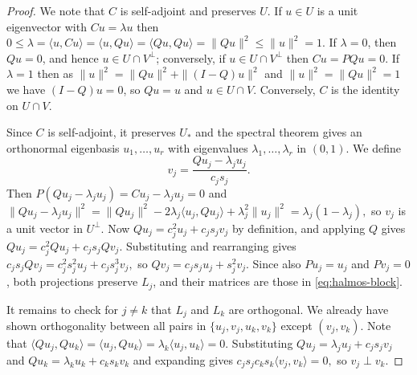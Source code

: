 \documentclass[10pt,a4paper]{amsart}
\newcommand{\lL}{\lambda}
\begin{document}
\begin{proof}
We note that $C$ is self-adjoint and preserves $U$.
If $u\in U$ is a unit eigenvector with $Cu=\lambda u$ then 
\(  0 \le \lambda
 =\langle u,Cu\rangle
 =\langle u,Qu\rangle
 =\langle Qu,Qu\rangle
 =\|Qu\|^2 \le \|u\|^2 = 1 \).
If $\lambda=0$, then $Qu=0$, and hence $u\in U\cap V^\perp$;
conversely, if $u\in U\cap V^\perp$ then $Cu = PQu=0$.
If $\lambda=1$ then as $\|u\|^2=\|Qu\|^2+\|(I-Q)u\|^2$
and $\|u\|^2=\|Qu\|^2=1$ we have $(I-Q)u=0$, so $Qu=u$ and $u\in U\cap V$. 
Conversely, $C$ is the identity on $U\cap V$.  

Since $C$ is self-adjoint, it preserves $U_*$ and the
spectral theorem  gives an orthonormal eigenbasis $u_1,\ldots,u_r$ 
with eigenvalues  $\lL_1,\ldots,\lL_r$ in $(0,1)$. We define
\[
 v_j=\frac{Qu_j-\lambda_j u_j}{c_js_j}.
\]
Then
\(
 P(Qu_j-\lambda_j u_j)
 =Cu_j-\lambda_j u_j
 =0
\)
and
\(
 \|Qu_j-\lambda_j u_j\|^2
 =
 \|Qu_j\|^2
 -2\lambda_j\langle u_j,Qu_j\rangle
 +\lambda_j^2\|u_j\|^2
 =\lambda_j(1-\lambda_j),
\)
so $v_j$ is a unit vector in $U^\perp$.
Now
\(
 Qu_j=c_j^2u_j+c_js_jv_j
\)
by definition, and applying $Q$ gives
\(
 Qu_j =c_j^2Qu_j+c_js_jQv_j.
\)
Substituting and rearranging gives
\(
 c_js_jQv_j
 =c_j^2s_j^2u_j+c_js_j^3v_j,
\)
so
\(
 Qv_j=c_js_ju_j+s_j^2v_j.
\)
Since also $Pu_j=u_j$ and $Pv_j=0$, both projections preserve
$L_j$, and their matrices are those in \eqref{eq:halmos-block}.

It remains to check for $j \ne k$ that $L_j$ and $L_k$ are orthogonal. 
We already have shown orthogonality between all pairs in $\{u_j,v_j,u_k,v_k\}$
except $(v_j,v_k)$. Note that
\(
 \langle Qu_j,Qu_k\rangle
 =\langle u_j,Qu_k\rangle
 =\lambda_k\langle u_j,u_k\rangle
 =0.
\)
Substituting $Qu_j=\lambda_j u_j+c_js_jv_j$
and $Qu_k=\lambda_k u_k+c_ks_kv_k$
and expanding gives 
\(
 c_js_jc_ks_k\langle v_j,v_k\rangle=0,
\)
so $v_j\perp v_k$.
\end{proof}
\end{document}
